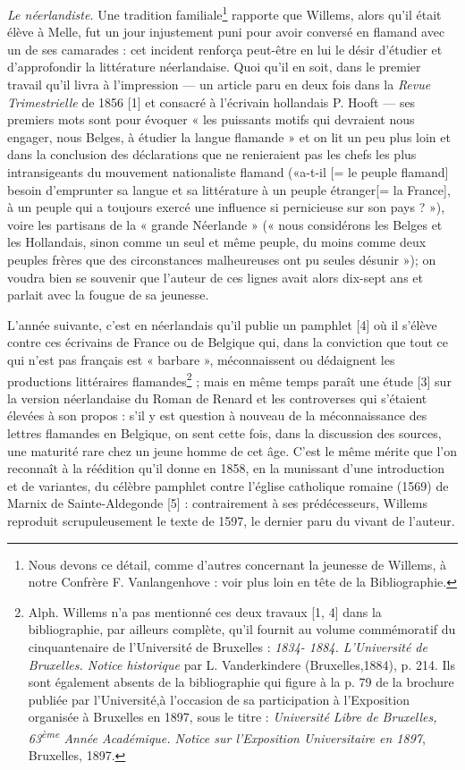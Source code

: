 \documentclass{book}%
\newcommand{\italique}[1]{\textit{#1}}%
\newcommand{\expo}[1]{\textsuperscript{#1}}%
\newcommand{\note}[1]{\footnote{#1}}
\begin{document}
\italique{Le néerlandiste.} Une tradition familiale\note{Nous devons ce détail, comme d'autres concernant la jeunesse de Willems, à notre Confrère F. Vanlangenhove : voir plus loin en tête de la Bibliographie.} rapporte que Willems, alors qu'il était élève à Melle, fut un jour injustement puni pour avoir conversé en flamand avec un de ses camarades : cet incident renforça peut-être en lui le désir d'étudier et d'approfondir la littérature néerlandaise.
Quoi qu'il en soit, dans le premier travail qu'il livra à l'impression — un article paru en deux fois dans la \italique{Revue Trimestrielle} de 1856 [1] et consacré à l'écrivain hollandais P. Hooft — ses premiers mots sont pour évoquer « les puissants motifs qui devraient nous engager, nous Belges, à étudier la langue flamande » et on lit un peu plus loin et dans la conclusion des déclarations que ne renieraient pas les chefs les plus intransigeants du mouvement nationaliste flamand («a-t-il [= le peuple flamand] besoin d'emprunter sa langue et sa littérature à un peuple étranger[= la France], à un peuple qui a toujours exercé une influence si pernicieuse sur son pays ? »), voire les partisans de la « grande Néerlande » (« nous considérons les Belges et les Hollandais, sinon comme un seul et même peuple, du moins comme deux peuples frères que des circonstances malheureuses ont pu seules désunir »); on voudra bien se souvenir que l'auteur de ces lignes avait alors dix-sept ans et parlait avec la fougue de sa jeunesse.

L'année suivante, c'est en néerlandais qu'il publie un pamphlet [4] où il s'élève contre ces écrivains de France ou de Belgique qui, dans la conviction que tout ce qui n'est pas français est « barbare », méconnaissent ou dédaignent les productions littéraires flamandes\note{Alph. Willems n'a pas mentionné ces deux travaux [1, 4] dans la bibliographie, par ailleurs complète, qu'il fournit au volume commémoratif du cinquantenaire de l'Université de Bruxelles : \italique{1834- 1884. L'Université de Bruxelles. Notice historique} par L. Vanderkindere (Bruxelles,1884), p. 214. Ils sont également absents de la bibliographie qui figure à la p. 79 de la brochure publiée par l'Université,à l'occasion de sa participation à l'Exposition organisée à Bruxelles en 1897, sous le titre : \italique{Université Libre de Bruxelles, 63\expo{ème} Année Académique. Notice sur l'Exposition Universitaire en 1897}, Bruxelles, 1897.} ; mais en même temps paraît une étude [3] sur la version néerlandaise du Roman de Renard et les controverses qui s'étaient élevées à son propos : s'il y est question à nouveau de la méconnaissance des lettres flamandes en Belgique, on sent cette fois, dans la discussion des sources, une maturité rare chez un jeune homme de cet âge.
C'est le même mérite que l'on reconnaît à la réédition qu'il donne en 1858, en la munissant d'une introduction et de variantes, du célèbre pamphlet contre l'église catholique romaine (1569) de Marnix de Sainte-Aldegonde [5] : contrairement à ses prédécesseurs, Willems reproduit scrupuleusement le texte de 1597, le dernier paru du vivant de l'auteur. 
\end{document}
